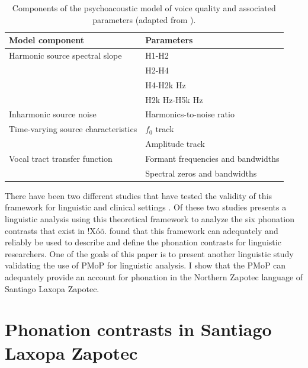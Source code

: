 \documentclass[12pt, letterpaper]{article}
\providecommand{\lsptoprule}{\midrule\toprule}
\providecommand{\lspbottomrule}{\bottomrule\midrule}
\begin{document}
\begin{table}[!h]
    \centering
    \caption{Components of the psychoacoustic model of voice quality and associated parameters (adapted from \cite{kreimanUnifiedTheoryVoice2014,garellekPhoneticsVoice2019}).}
    \label{tab:Kreiman}
    \begin{tabular}{ll}
    \lsptoprule
    Model component & Parameters \\
    \hline
    Harmonic source spectral slope      & H1-H2 \\
                                        & H2-H4 \\
	                                & H4-H2k Hz \\
	                                & H2k Hz-H5k Hz \\
    Inharmonic source noise             & Harmonics-to-noise ratio \\
    Time-varying source characteristics & $f_0$ track \\
	                                & Amplitude track \\
    Vocal tract transfer function       & Formant frequencies and bandwidths \\
	                                & Spectral zeros and bandwidths\\
    \lspbottomrule
    \end{tabular}
\end{table}

There have been two different studies that have tested the validity of this framework for linguistic and clinical settings \citep{garellekAcousticDiscriminabilityComplex2020, kreimanValidatingPsychoacousticModel2021}. Of these two studies \citet{garellekAcousticDiscriminabilityComplex2020} presents a linguistic analysis using this theoretical framework to analyze the six phonation contrasts that exist in !Xóõ. \citeauthor{garellekAcousticDiscriminabilityComplex2020} found that this framework can adequately and reliably be used to describe and define the phonation contrasts for linguistic researchers. One of the goals of this paper is to present another linguistic study validating the use of PMoP for linguistic analysis. I show that the PMoP can adequately provide an account for phonation in the Northern Zapotec language of Santiago Laxopa Zapotec. 

\section{Phonation contrasts in Santiago Laxopa Zapotec} \label{sec:SLZ}
\end{document}
